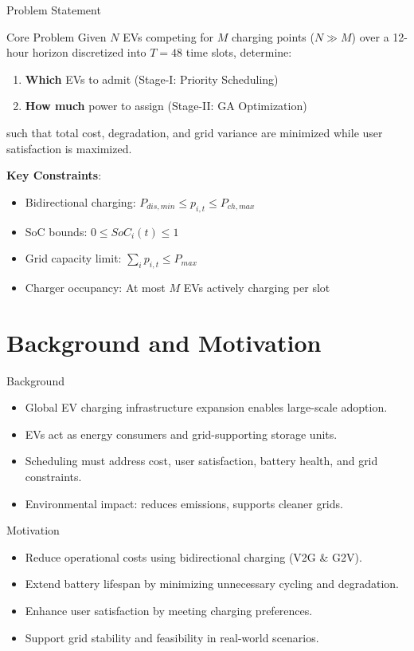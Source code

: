 \documentclass{beamer}
\begin{document}
\begin{frame}{Problem Statement}
  \begin{block}{Core Problem}
  Given $N$ EVs competing for $M$ charging points ($N \gg M$) over a 12-hour horizon discretized into $T = 48$ time slots, determine:
  \begin{enumerate}
      \item \textbf{Which} EVs to admit (Stage-I: Priority Scheduling)
      \item \textbf{How much} power to assign (Stage-II: GA Optimization)
  \end{enumerate}
  such that total cost, degradation, and grid variance are minimized while user satisfaction is maximized.
  \end{block}
  \vspace{0.3cm}
  \textbf{Key Constraints}:
  \begin{itemize}
      \item Bidirectional charging: $P_{dis,min} \leq p_{i,t} \leq P_{ch,max}$
      \item SoC bounds: $0 \leq SoC_i(t) \leq 1$
      \item Grid capacity limit: $\sum_i p_{i,t} \leq P_{max}$
      \item Charger occupancy: At most $M$ EVs actively charging per slot
  \end{itemize}
\end{frame}

\section{Background and Motivation}
\begin{frame}{Background}
  \begin{itemize}
    \item Global EV charging infrastructure expansion enables large-scale adoption.
    \item EVs act as energy consumers and grid-supporting storage units.
    \item Scheduling must address cost, user satisfaction, battery health, and grid constraints.
    \item Environmental impact: reduces emissions, supports cleaner grids.
  \end{itemize}
\end{frame}
\begin{frame}{Motivation}
  \begin{itemize}
    \item Reduce operational costs using bidirectional charging (V2G \& G2V).
    \item Extend battery lifespan by minimizing unnecessary cycling and degradation.
    \item Enhance user satisfaction by meeting charging preferences.
    \item Support grid stability and feasibility in real-world scenarios.
  \end{itemize}
\end{frame}
\end{document}
